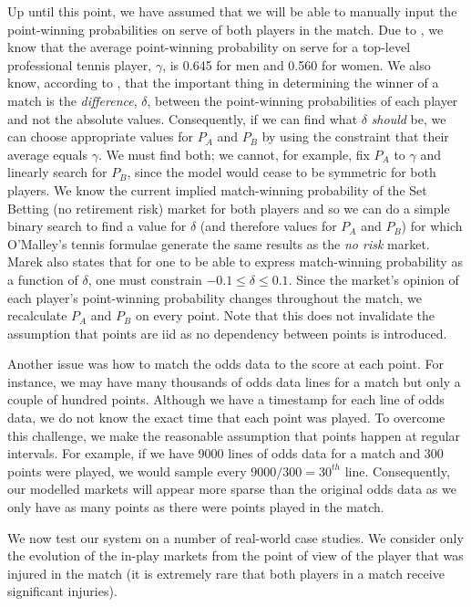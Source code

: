 \documentclass[letterpaper,12pt]{article}
\begin{document}
Up until this point, we have assumed that we will be able to manually input the point-winning probabilities on serve of both players in the match.  Due to \cite{dominance}, we know that the average point-winning probability on serve for a top-level professional tennis player, $\gamma$, is 0.645 for men and 0.560 for women.  We also know, according to \cite{marek}, that the important thing in determining the winner of a match is the \textit{difference}, $\delta$, between the point-winning probabilities of each player and not the absolute values.  Consequently, if we can find what $\delta$ \textit{should} be, we can choose appropriate values for $P_A$ and $P_B$ by using the constraint that their average equals $\gamma$.  We must find both; we cannot, for example, fix $P_A$ to $\gamma$ and linearly search for $P_B$, since the model would cease to be symmetric for both players.  We know the current implied match-winning probability of the Set Betting (no retirement risk) market for both players and so we can do a simple binary search to find a value for $\delta$ (and therefore values for $P_A$ and $P_B$) for which O'Malley's tennis formulae generate the same results as the \textit{no risk} market.  Marek also states that for one to be able to express match-winning probability as a function of $\delta$, one must constrain $-0.1 \leq \delta \leq 0.1$.  Since the market's opinion of each player's point-winning probability changes throughout the match, we recalculate $P_A$ and $P_B$ on every point.  Note that this does not invalidate the assumption that points are iid as no dependency between points is introduced.

Another issue was how to match the odds data to the score at each point.  For instance, we may have many thousands of odds data lines for a match but only a couple of hundred points.  Although we have a timestamp for each line of odds data, we do not know the exact time that each point was played.  To overcome this challenge, we make the reasonable assumption that points happen at regular intervals.  For example, if we have 9000 lines of odds data for a match and 300 points were played, we would sample every $9000 / 300 = 30^{th}$ line.  Consequently, our modelled markets will appear more sparse than the original odds data as we only have as many points as there were points played in the match.

We now test our system on a number of real-world case studies.  We consider only the evolution of the in-play markets from the point of view of the player that was injured in the match (it is extremely rare that both players in a match receive significant injuries).
\end{document}
